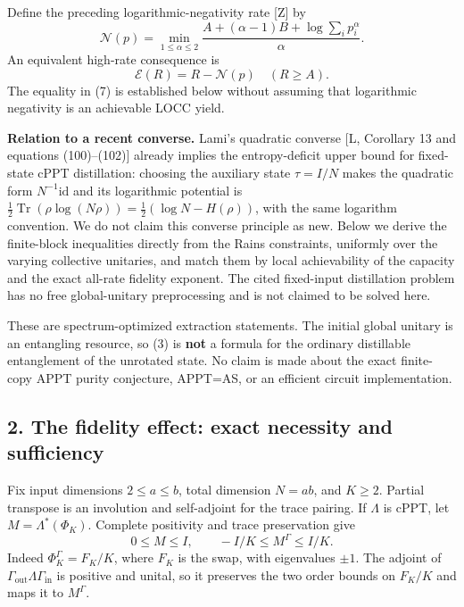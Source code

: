 \documentclass[11pt]{article}
\begin{document}
Define the preceding logarithmic-negativity rate {[}Z{]} by \[
 \mathcal N(p)=\min_{1\le\alpha\le2}
 \frac{A+(\alpha-1)B+\log\sum_i p_i^\alpha}{\alpha}.
 \tag{6}
\] An equivalent high-rate consequence is \[
 \mathcal E(R)=R-\mathcal N(p)\quad(R\ge A).
 \tag{7}
\] The equality in (7) is established below without assuming that logarithmic negativity is an achievable LOCC yield.

\textbf{Relation to a recent converse.} Lami's quadratic converse {[}L, Corollary 13 and equations (100)--(102){]} already implies the entropy-deficit upper bound for fixed-state cPPT distillation: choosing the auxiliary state \(\tau=I/N\) makes the quadratic form \(N^{-1}\mathrm{id}\) and its logarithmic potential is \(\tfrac12\operatorname{Tr}(\rho\log(N\rho))=\tfrac12(\log N-H(\rho))\), with the same logarithm convention. We do not claim this converse principle as new. Below we derive the finite-block inequalities directly from the Rains constraints, uniformly over the varying collective unitaries, and match them by local achievability of the capacity and the exact all-rate fidelity exponent. The cited fixed-input distillation problem has no free global-unitary preprocessing and is not claimed to be solved here.

These are spectrum-optimized extraction statements. The initial global unitary is an entangling resource, so (3) is \textbf{not} a formula for the ordinary distillable entanglement of the unrotated state. No claim is made about the exact finite-copy APPT purity conjecture, APPT=AS, or an efficient circuit implementation.

\hypertarget{the-fidelity-effect-exact-necessity-and-sufficiency}{%
\subsection{2. The fidelity effect: exact necessity and sufficiency}\label{the-fidelity-effect-exact-necessity-and-sufficiency}}

Fix input dimensions \(2\le a\le b\), total dimension \(N=ab\), and \(K\ge2\). Partial transpose is an involution and self-adjoint for the trace pairing. If \(\Lambda\) is cPPT, let \(M=\Lambda^*(\Phi_K)\). Complete positivity and trace preservation give \[
 0\le M\le I,\qquad -I/K\le M^\Gamma\le I/K.
 \tag{8}
\] Indeed \(\Phi_K^\Gamma=F_K/K\), where \(F_K\) is the swap, with eigenvalues \(\pm1\). The adjoint of \(\Gamma_{\mathrm{out}}\Lambda\Gamma_{\mathrm{in}}\) is positive and unital, so it preserves the two order bounds on \(F_K/K\) and maps it to \(M^\Gamma\).
\end{document}

